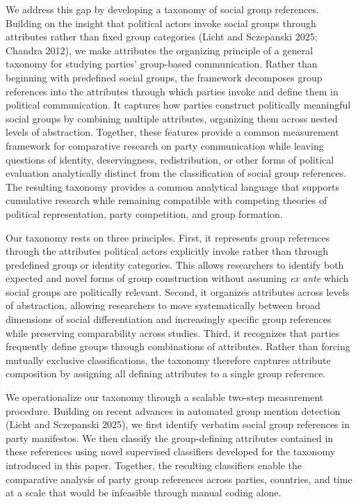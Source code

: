 \documentclass[12pt]{article}
\begin{document}
We address this gap by developing a taxonomy of social group references.
Building on the insight that political actors invoke social groups through attributes rather than fixed group categories (Licht and Sczepanski 2025; Chandra 2012), we make attributes the organizing principle of a general taxonomy for studying parties' group-based communication.
Rather than beginning with predefined social groups, the framework decomposes group references into the attributes through which parties invoke and define them in political communication.
It captures how parties construct politically meaningful social groups by combining multiple attributes, organizing them across nested levels of abstraction.
Together, these features provide a common measurement framework for comparative research on party communication while leaving questions of identity, deservingness, redistribution, or other forms of political evaluation analytically distinct from the classification of social group references.
The resulting taxonomy provides a common analytical language that supports cumulative research while remaining compatible with competing theories of political representation, party competition, and group formation.

Our taxonomy rests on three principles.
First, it represents group references through the attributes political actors explicitly invoke rather than through predefined group or identity categories.
This allows researchers to identify both expected and novel forms of group construction without assuming \emph{ex ante} which social groups are politically relevant.
Second, it organizes attributes across levels of abstraction, allowing researchers to move systematically between broad dimensions of social differentiation and increasingly specific group references while preserving comparability across studies.
Third, it recognizes that parties frequently define groups through combinations of attributes.
Rather than forcing mutually exclusive classifications, the taxonomy therefore captures attribute composition by assigning all defining attributes to a single group reference.

We operationalize our taxonomy through a scalable two-step measurement procedure.
Building on recent advances in automated group mention detection (Licht and Sczepanski 2025), we first identify verbatim social group references in party manifestos.
We then classify the group-defining attributes contained in these references using novel supervised classifiers developed for the taxonomy introduced in this paper.
Together, the resulting classifiers enable the comparative analysis of party group references across parties, countries, and time at a scale that would be infeasible through manual coding alone.
\end{document}

